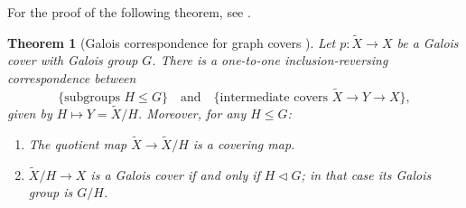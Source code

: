 \documentclass[lualatex,12pt]{article}
\newtheorem{thm}{Theorem}
\begin{document}
For the proof of the following theorem, see \cite{terras2010zeta}.
\begin{thm}[Galois correspondence for graph covers \cite{terras2010zeta}]
Let \(p:\tilde{X}\to X\) be a Galois cover with Galois group \(G\).
There is a one-to-one inclusion-reversing correspondence between
\[
\{\mbox{subgroups } H\le G\}
\quad\mbox{and}\quad
\{\mbox{intermediate covers } \tilde{X}\to Y\to X\},
\]
given by \(H\mapsto Y=\tilde{X}/H\).
Moreover, for any \(H\le G\):
\begin{enumerate}
  \item The quotient map \(\tilde{X}\to\tilde{X}/H\) is a covering map.
  \item \(\tilde{X}/H\to X\) is a Galois  cover if and only if \(H\triangleleft G\);
  in that case its Galois group is \(G/H\).
\end{enumerate}
\end{thm}
\end{document}
